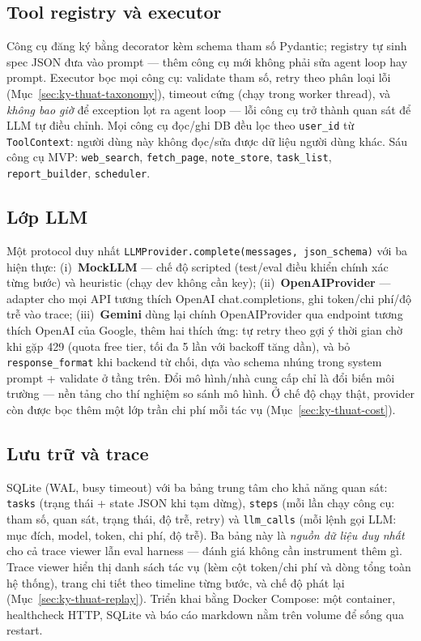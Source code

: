 \subsection{Tool registry và executor}
\label{sec:tool-registry}

Công cụ đăng ký bằng decorator kèm schema tham số Pydantic; registry tự sinh
spec JSON đưa vào prompt --- thêm công cụ mới không phải sửa agent loop hay
prompt. Executor bọc mọi công cụ: validate tham số, retry theo phân loại lỗi
(Mục~\ref{sec:ky-thuat-taxonomy}), timeout cứng (chạy trong worker thread), và
\emph{không bao giờ} để exception lọt ra agent loop --- lỗi công cụ trở thành
quan sát để LLM tự điều chỉnh. Mọi công cụ đọc/ghi DB đều lọc theo
\texttt{user\_id} từ \texttt{ToolContext}: người dùng này không đọc/sửa được
dữ liệu người dùng khác. Sáu công cụ MVP: \texttt{web\_search},
\texttt{fetch\_page}, \texttt{note\_store}, \texttt{task\_list},
\texttt{report\_builder}, \texttt{scheduler}.

\subsection{Lớp LLM}
\label{sec:llm-layer}

Một protocol duy nhất \texttt{LLMProvider.complete(messages, json\_schema)}
với ba hiện thực: (i)~\textbf{MockLLM} --- chế độ scripted (test/eval điều
khiển chính xác từng bước) và heuristic (chạy dev không cần key);
(ii)~\textbf{OpenAIProvider} --- adapter cho mọi API tương thích OpenAI
chat.completions, ghi token/chi phí/độ trễ vào trace;
(iii)~\textbf{Gemini} dùng lại chính OpenAIProvider qua endpoint tương thích
OpenAI của Google, thêm hai thích ứng: tự retry theo gợi ý thời gian chờ khi
gặp 429 (quota free tier, tối đa 5 lần với backoff tăng dần), và bỏ
\texttt{response\_format} khi backend từ chối, dựa vào schema nhúng trong
system prompt + validate ở tầng trên. Đổi mô hình/nhà cung cấp chỉ là đổi
biến môi trường --- nền tảng cho thí nghiệm so sánh mô hình. Ở chế độ chạy
thật, provider còn được bọc thêm một lớp trần chi phí mỗi tác vụ
(Mục~\ref{sec:ky-thuat-cost}).

\subsection{Lưu trữ và trace}
\label{sec:trace-store}

SQLite (WAL, busy timeout) với ba bảng trung tâm cho khả năng quan sát:
\texttt{tasks} (trạng thái + state JSON khi tạm dừng), \texttt{steps} (mỗi lần
chạy công cụ: tham số, quan sát, trạng thái, độ trễ, retry) và
\texttt{llm\_calls} (mỗi lệnh gọi LLM: mục đích, model, token, chi phí, độ
trễ). Ba bảng này là \emph{nguồn dữ liệu duy nhất} cho cả trace viewer lẫn
eval harness --- đánh giá không cần instrument thêm gì. Trace viewer hiển thị
danh sách tác vụ (kèm cột token/chi phí và dòng tổng toàn hệ thống), trang
chi tiết theo timeline từng bước, và chế độ phát lại
(Mục~\ref{sec:ky-thuat-replay}). Triển khai bằng Docker Compose: một
container, healthcheck HTTP, SQLite và báo cáo markdown nằm trên volume để
sống qua restart.


